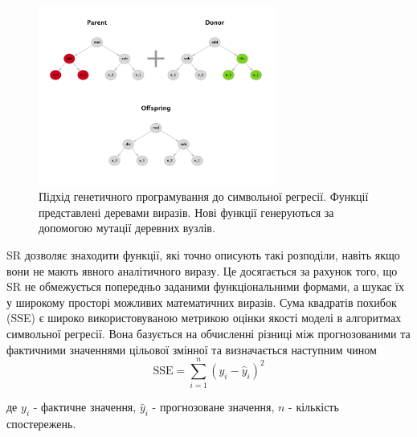 \documentclass[14pt,a4paper,titlepage,oneside]{book}
\numberwithin{equation}{part}
\begin{document}
\begin{figure}[h]
\centering
\includegraphics[width=0.7\textwidth]{exp_SR.png} 
\caption{Підхід генетичного програмування до символьної регресії. Функції представлені деревами виразів. Нові функції генеруються за допомогою мутації деревних вузлів.}
\end{figure}
SR дозволяє знаходити функції, які точно описують такі розподіли, навіть якщо вони не мають явного аналітичного виразу. Це досягається за рахунок того, що SR не обмежується попередньо заданими функціональними формами, а шукає їх у широкому просторі можливих математичних виразів.
Сума квадратів похибок (SSE) є широко використовуваною метрикою оцінки якості моделі в алгоритмах символьної регресії. Вона базується на обчисленні різниці між прогнозованими та фактичними значеннями цільової змінної  та визначається наступним чином
\begin{equation}
\text{SSE} = \sum_{i=1}^{n} (y_i - \hat{y}_i)^2
\end{equation}

де $y_i$ - фактичне значення, $\hat{y}_i$ - прогнозоване значення, $n$ - кількість спостережень.
\end{document}
